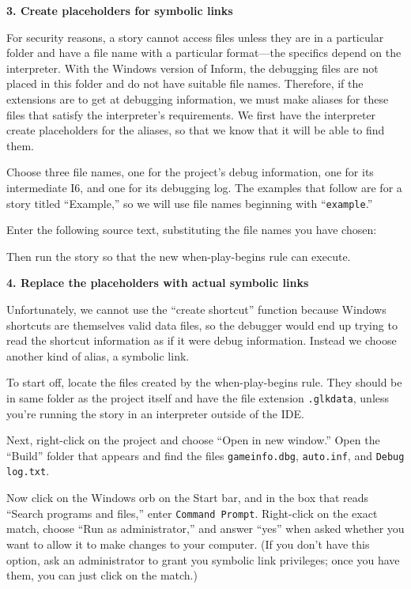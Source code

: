\documentclass{book}
\begin{document}
\textbf{3. Create placeholders for symbolic links}

For security reasons, a story cannot access files unless they are in a
particular folder and have a file name with a particular format---the specifics
depend on the interpreter.  With the Windows version of Inform, the debugging
files are not placed in this folder and do not have suitable file names.
Therefore, if the extensions are to get at debugging information, we must make
aliases for these files that satisfy the interpreter's requirements.  We first
have the interpreter create placeholders for the aliases, so that we know that
it will be able to find them.

Choose three file names, one for the project's debug information, one for its
intermediate I6, and one for its debugging log.  The examples that follow are
for a story titled ``Example,'' so we will use file names beginning with
``\texttt{example}.''

Enter the following source text, substituting the file names you have chosen:

\begin{quote}
  
\end{quote}

Then run the story so that the new when-play-begins rule can execute.

\textbf{4. Replace the placeholders with actual symbolic links}

Unfortunately, we cannot use the ``create shortcut'' function because Windows
shortcuts are themselves valid data files, so the debugger would end up trying
to read the shortcut information as if it were debug information.  Instead we
choose another kind of alias, a symbolic link.

To start off, locate the files created by the when-play-begins rule.  They
should be in same folder as the project itself and have the file extension
\texttt{.glkdata}, unless you're running the story in an interpreter outside of
the IDE.

Next, right-click on the project and choose ``Open in new window.''  Open the
``Build'' folder that appears and find the files \texttt{gameinfo.dbg},
\texttt{auto.inf}, and \texttt{Debug log.txt}.

Now click on the Windows orb on the Start bar, and in the box that reads
``Search programs and files,'' enter \texttt{Command Prompt}.  Right-click on
the exact match, choose ``Run as administrator,'' and answer ``yes'' when asked
whether you want to allow it to make changes to your computer.  (If you don't
have this option, ask an administrator to grant you symbolic link privileges;
once you have them, you can just click on the match.)
\end{document}
